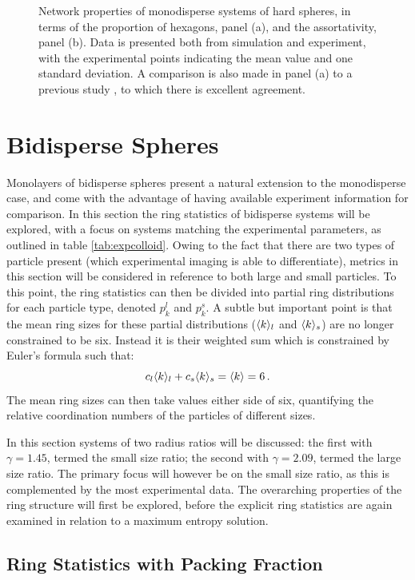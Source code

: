 \begin{figure}[bt]
     \caption{Network properties of monodisperse systems of \qtd{} hard spheres, in terms of the proportion of hexagons, panel (a), and the assortativity, panel (b). Data is presented both from simulation and experiment, with the experimental points indicating the mean value and one standard deviation. A comparison is also made in panel (a) to a previous study \cite{Kumar2005}, to which there is excellent agreement.}
     \label{fig:mono}
\end{figure}


\section{Bidisperse Spheres}
\label{s:bidisperse}

Monolayers of bidisperse spheres present a natural extension to the monodisperse case, and come with the advantage of having available experiment information for comparison.
In this section the ring statistics of bidisperse systems will be explored, with a focus on systems matching the experimental parameters, as outlined in table \ref{tab:expcolloid}.
Owing to the fact that there are two types of particle present (which experimental imaging is able to differentiate), metrics in this section will be considered in reference to both large and small particles.
To this point, the ring statistics can then be divided into partial ring distributions for each particle type, denoted $p_k^l$ and $p_k^s$.
A subtle but important point is that the mean ring sizes for these partial distributions ($\langle k \rangle_l$ and $\langle k \rangle_s$) are no longer constrained to be six.
Instead it is their weighted sum which is constrained by Euler's formula such that:
\begin{equation}
	c_l\langle k \rangle_l+c_s\langle k \rangle_s = \langle k \rangle = 6\,.
\end{equation}
The mean ring sizes can then take values either side of six, quantifying the relative coordination numbers of the particles of different sizes.

In this section systems of two radius ratios will be discussed: the first with $\gamma=1.45$, termed the small size ratio; the second with $\gamma=2.09$, termed the large size ratio.
The primary focus will however be on the small size ratio, as this is complemented by the most experimental data.
The overarching properties of the ring structure will first be explored, before the explicit ring statistics are again examined in relation to a maximum entropy solution.


\subsection{Ring Statistics with Packing Fraction}

